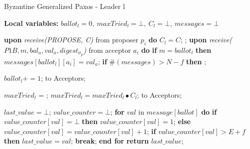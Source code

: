 \begin{algorithm}
	\caption{Byzantine Generalized Paxos - Leader l}
	\textbf{Local variables:} $ballot_l = 0,\ maxTried_l = \bot,\ C_l = \bot,\ messages = \bot$
	\begin{algorithmic}[1]
		\State \textbf{upon} \textit{receive(PROPOSE, C)} from proposer $p_i$ \textbf{do} 
		\State \hspace{\algorithmicindent} $C_l = C$;
		\State \hspace{\algorithmicindent} ;
		\State
		\State \textbf{upon} \textit{receive($P1B, m, bal_a, val_a, digest_{\sigma_p}$)} from acceptor $a_i$ \textbf{do}
		\State \hspace{\algorithmicindent} \textbf{if} $m = ballot_l$ \textbf{then}
		\State \hspace{\algorithmicindent}\hspace{\algorithmicindent}\hspace{\algorithmicindent}  $messages[ballot_l][a_i] = val_a$;
		\State \hspace{\algorithmicindent} \textbf{if} $\#(messages) > N-f$ \textbf{then} 
		\State \hspace{\algorithmicindent}\hspace{\algorithmicindent} ;

		\State
		\State $ballot_l \mathrel{+{=}} 1$;
		\State {} to Acceptors;
		\EndFunction
		
		\State
		\State $maxTried_l$ = ;
		\State $maxTried_l = maxTried_l \bullet C_l$;
		\State {} to Acceptors;
		\EndFunction
		
		\State
		\State $last\_value = \bot$;
		\State $value\_counter = \bot$;
		\State \textbf{for} $val$ in $message[ballot]$ \textbf{do}
		\State \hspace{\algorithmicindent}\textbf{if} $value\_counter[val] = \bot$ \textbf{then}
		\State \hspace{\algorithmicindent}\hspace{\algorithmicindent}$value\_counter[val] = 1$;
		\State \hspace{\algorithmicindent}\textbf{else}
		\State \hspace{\algorithmicindent}\hspace{\algorithmicindent}$value\_counter[val] = value\_counter[val] + 1$; 
		\State
		\State \hspace{\algorithmicindent}\textbf{if} $value\_counter[val] > E+f$ \textbf{then}
		\State \hspace{\algorithmicindent}\hspace{\algorithmicindent}$last\_value = val$;
		\State \hspace{\algorithmicindent}\hspace{\algorithmicindent}\textbf{break};
		\State \textbf{end for}
		\State \textbf{return} $last\_value$;
		\EndFunction
		

\end{algorithmic}
\end{algorithm}
